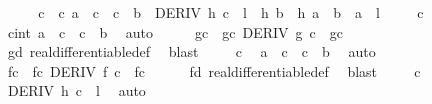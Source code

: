 \begin{isabellebody}
\isanewline
\ \ \isamarkupfalse%
\ \isamarkupfalse%
\ c\ \ c{\isacharcolon}{\kern0pt}\ {\isachardoublequoteopen}a\ {\isacharless}{\kern0pt}\ c\ {\isasymand}\ c\ {\isacharless}{\kern0pt}\ b\ {\isasymand}\ DERIV\ {\isacharquery}{\kern0pt}h\ c\ {\isacharcolon}{\kern0pt}{\isachargreater}{\kern0pt}\ l\ {\isasymand}\ {\isacharquery}{\kern0pt}h\ b\ {\isacharminus}{\kern0pt}\ {\isacharquery}{\kern0pt}h\ a\ {\isacharequal}{\kern0pt}\ {\isacharparenleft}{\kern0pt}b\ {\isacharminus}{\kern0pt}\ a{\isacharparenright}{\kern0pt}\ {\isacharasterisk}{\kern0pt}\ l{\isachardoublequoteclose}\ \isacommand{{\isachardot}{\kern0pt}{\isachardot}{\kern0pt}}\isamarkupfalse%
\isanewline
\isanewline
\ \ \isamarkupfalse%
\ c\ \isamarkupfalse%
\ cint{\isacharcolon}{\kern0pt}\ {\isachardoublequoteopen}a\ {\isacharless}{\kern0pt}\ c\ {\isasymand}\ c\ {\isacharless}{\kern0pt}\ b{\isachardoublequoteclose}\ \isamarkupfalse%
\ auto\isanewline
\ \ \isamarkupfalse%
\ \isamarkupfalse%
\ g{\isacharprime}{\kern0pt}c\ \ g{\isacharprime}{\kern0pt}c{\isacharcolon}{\kern0pt}\ {\isachardoublequoteopen}DERIV\ g\ c\ {\isacharcolon}{\kern0pt}{\isachargreater}{\kern0pt}\ g{\isacharprime}{\kern0pt}c{\isachardoublequoteclose}\isanewline
\ \ \ \ \isamarkupfalse%
\ gd\ real{\isacharunderscore}{\kern0pt}differentiable{\isacharunderscore}{\kern0pt}def\ \isamarkupfalse%
\ blast\ \isanewline
\ \ \isamarkupfalse%
\ c\ \isamarkupfalse%
\ {\isachardoublequoteopen}a\ {\isacharless}{\kern0pt}\ c\ {\isasymand}\ c\ {\isacharless}{\kern0pt}\ b{\isachardoublequoteclose}\ \isamarkupfalse%
\ auto\isanewline
\ \ \isamarkupfalse%
\ \isamarkupfalse%
\ f{\isacharprime}{\kern0pt}c\ \ f{\isacharprime}{\kern0pt}c{\isacharcolon}{\kern0pt}\ {\isachardoublequoteopen}DERIV\ f\ c\ {\isacharcolon}{\kern0pt}{\isachargreater}{\kern0pt}\ f{\isacharprime}{\kern0pt}c{\isachardoublequoteclose}\isanewline
\ \ \ \ \isamarkupfalse%
\ fd\ real{\isacharunderscore}{\kern0pt}differentiable{\isacharunderscore}{\kern0pt}def\ \isamarkupfalse%
\ blast\ \isanewline
\isanewline
\ \ \isamarkupfalse%
\ c\ \isamarkupfalse%
\ {\isachardoublequoteopen}DERIV\ {\isacharquery}{\kern0pt}h\ c\ {\isacharcolon}{\kern0pt}{\isachargreater}{\kern0pt}\ l{\isachardoublequoteclose}\ \isamarkupfalse%
\ auto\isanewline

\end{isabellebody}
